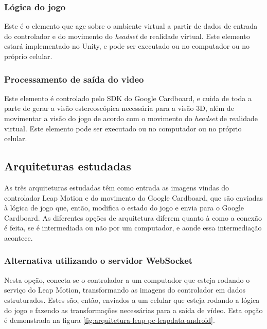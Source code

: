 \subsubsection{Lógica do jogo}\label{subsubsec-elemento-logica-jogo}

Este é o elemento que age sobre o ambiente virtual a partir de dados de entrada do controlador e do movimento do \textit{headset} de realidade virtual. Este elemento estará implementado no Unity, e pode ser executado ou no computador ou no próprio celular.

\subsubsection{Processamento de saída do video}\label{subsubsec-elemento-video}

Este elemento é controlado pelo SDK do Google Cardboard, e cuida de toda a parte de gerar a visão estereoscópica necessária para a visão 3D, além de movimentar a visão do jogo de acordo com o movimento do \textit{headset} de realidade virtual. Este elemento pode ser executado ou no computador ou no próprio celular.

\subsection{Arquiteturas estudadas}\label{subsec-arquiteturas-estudadas}

As três arquiteturas estudadas têm como entrada as imagens vindas do controlador Leap Motion e do movimento do Google Cardboard, que são enviadas à lógica de jogo que, então, modifica o estado do jogo e envia para o Google Cardboard. As diferentes opções de arquitetura diferem quanto à como a conexão é feita, se é intermediada ou não por um computador, e aonde essa intermediação acontece.

\subsubsection{Alternativa utilizando o servidor WebSocket}\label{subsubsec-arquiteturas-leapmotion-pc-leapdata-android}

Nesta opção, conecta-se o controlador a um computador que esteja rodando o serviço do Leap Motion, transformando as imagens do controlador em dados estruturados. Estes são, então, enviados a um celular que esteja rodando a lógica do jogo e fazendo as transformações necessárias para a saída de vídeo. Esta opção é demonstrada na figura \ref{fig:arquitetura-leap-pc-leapdata-android}.

